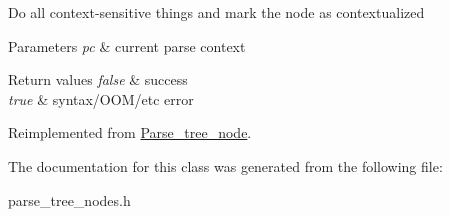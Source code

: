 Do all context-\/sensitive things and mark the node as contextualized


\begin{DoxyParams}{Parameters}
{\em pc} & current parse context\\
\hline
\end{DoxyParams}

\begin{DoxyRetVals}{Return values}
{\em false} & success \\
\hline
{\em true} & syntax/\+O\+O\+M/etc error \\
\hline
\end{DoxyRetVals}


Reimplemented from \mbox{\hyperlink{classParse__tree__node_a22d93524a537d0df652d7efa144f23da}{Parse\+\_\+tree\+\_\+node}}.



The documentation for this class was generated from the following file\+:\begin{DoxyCompactItemize}
\item 
parse\+\_\+tree\+\_\+nodes.\+h\end{DoxyCompactItemize}
